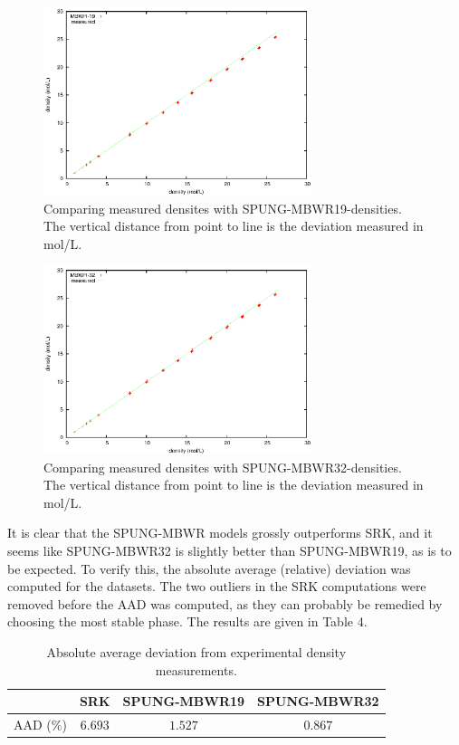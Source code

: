 \documentclass[english]{../thermomemo/thermomemo}
\numberwithin{equation}{section}
\begin{document}
\begin{figure}[h]
  \centering
  \includegraphics[width=0.7\textwidth]{figures/MBWR19_density.eps}
  \caption{Comparing measured densites with SPUNG-MBWR19-densities. The vertical distance from point to line is the deviation measured in mol/L.}
  \label{19_density}
\end{figure}

\begin{figure}[h]
  \centering
  \includegraphics[width=0.7\textwidth]{figures/MBWR32_density.eps}
  \caption{Comparing measured densites with SPUNG-MBWR32-densities. The vertical distance from point to line is the deviation measured in mol/L.}
  \label{32_density}
\end{figure}

It is clear that the SPUNG-MBWR models grossly outperforms SRK, and it seems like SPUNG-MBWR32 is slightly better than SPUNG-MBWR19, as is to be expected. To verify this, the absolute average (relative) deviation was computed for the datasets. The two outliers in the SRK computations were removed before the AAD was computed, as they can probably be remedied by choosing the most stable phase. The results are given in Table 4.

\begin{table}
  \label{aad}
  \centering
  \begin{tabular}{c | c c c}
    &  SRK     	&SPUNG-MBWR19 	&SPUNG-MBWR32      \\
    \hline
    AAD (\%)	        &  $6.693$     	&$1.527$ 	&$0.867$
  \end{tabular}
  \caption{Absolute average deviation from experimental density measurements.}
\end{table}
\end{document}

